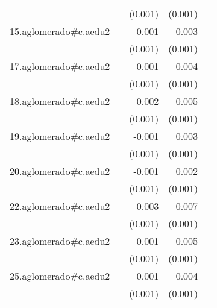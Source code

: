 {\begin{longtable}{l*{4}{D{.}{.}{-1}}}
            &                     &     (0.001)         &     (0.001)         &                     \\
\addlinespace
15.aglomerado#c.aedu2&                     &      -0.001         &       0.003\sym{***}&                     \\
            &                     &     (0.001)         &     (0.001)         &                     \\
\addlinespace
17.aglomerado#c.aedu2&                     &       0.001         &       0.004\sym{***}&                     \\
            &                     &     (0.001)         &     (0.001)         &                     \\
\addlinespace
18.aglomerado#c.aedu2&                     &       0.002         &       0.005\sym{***}&                     \\
            &                     &     (0.001)         &     (0.001)         &                     \\
\addlinespace
19.aglomerado#c.aedu2&                     &      -0.001         &       0.003\sym{**} &                     \\
            &                     &     (0.001)         &     (0.001)         &                     \\
\addlinespace
20.aglomerado#c.aedu2&                     &      -0.001         &       0.002\sym{*}  &                     \\
            &                     &     (0.001)         &     (0.001)         &                     \\
\addlinespace
22.aglomerado#c.aedu2&                     &       0.003\sym{*}  &       0.007\sym{***}&                     \\
            &                     &     (0.001)         &     (0.001)         &                     \\
\addlinespace
23.aglomerado#c.aedu2&                     &       0.001         &       0.005\sym{***}&                     \\
            &                     &     (0.001)         &     (0.001)         &                     \\
\addlinespace
25.aglomerado#c.aedu2&                     &       0.001         &       0.004\sym{***}&                     \\
            &                     &     (0.001)         &     (0.001)         &                     \\

\end{longtable}}
